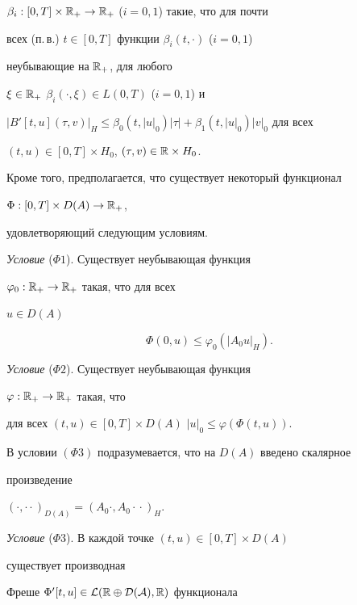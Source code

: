 $\beta_i:[0,T]\times\Bbb R_+\to\Bbb R_+$ ($i=0,1$) такие, что для почти 


всех (п.\,в.) $t\in[0,T]$ функции $\beta_i(t,\cdot)$ ($i=0,1$) 


неубывающие на $\Bbb R_+$, для любого 


$\xi\in\Bbb R_+$\; $\beta_i(\cdot,\xi)\in L(0,T)$ ($i=0,1$) и 


$|B'[t,u](\tau,v)|_H\le\beta_0(t,|u|_0)|\tau|+ 


\beta_1(t,|u|_0)|v|_0$ для всех 


$(t,u)\in[0,T]\times H_0$, $(\tau,v)\in\Bbb R\times H_0$. 


 


Кроме того, предполагается, что существует некоторый функционал 


$\Phi:[0,T]\times D(A)\to\Bbb R_+$, 


удовлетворяющий следующим условиям. 


 


{\it Условие} ($\Phi 1$). Существует неубывающая функция 


$\varphi_0:\Bbb R_+\to\Bbb R_+$ такая, что для всех 


$u\in D(A)$


$$


\Phi(0,u)\le\varphi_0(|A_0u|_H).


$$


 


{\it Условие} ($\Phi 2$). Существует неубывающая функция 


$\varphi:\Bbb R_+\to\Bbb R_+$ такая, что 


для всех $(t,u)\in[0,T]\times D(A)$\; $|u|_0\le\varphi(\Phi(t,u))$. 


 


В условии $(\Phi 3)$ подразумевается, что на $D(A)$ введено скалярное 


произведение 


$(\cdot,\cdot{}\cdot)_{D(A)}=(A_0\cdot,A_0\cdot{}\cdot)_H$. 


 


{\it Условие} ($\Phi 3$). В каждой точке $(t,u)\in[0,T]\times D(A)$ 


существует производная 


Фреше $\Phi'[t,u]\in\cal L(\Bbb R\oplus D(A),\Bbb R)$ функционала 


